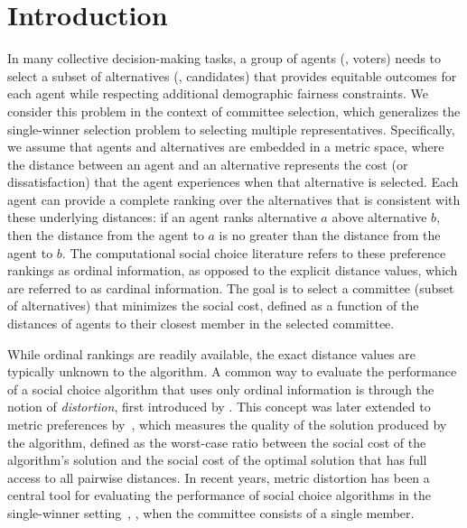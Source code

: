 \documentclass{article}
\begin{document}
\section{Introduction}

In many collective decision-making tasks, a group of agents (\eg, voters) needs to select a subset of alternatives (\eg, candidates) that provides equitable outcomes for each agent while respecting additional demographic fairness constraints.
We consider this problem in the context of committee selection, which generalizes the single-winner selection problem to selecting multiple representatives.
Specifically, we assume that agents and alternatives are embedded in a metric space, where the distance between an agent and an alternative represents the cost (or dissatisfaction) that the agent experiences when that alternative is selected. 
Each agent can provide a complete ranking over the alternatives that is consistent with these underlying distances: if an agent ranks alternative $a$ above alternative $b$, then the distance from the agent to $a$ is no greater than the distance from the agent to $b$. 
The computational social choice literature refers to these preference rankings as ordinal information, as opposed to the explicit distance values, which are referred to as cardinal information. 
The goal is to select a committee (subset of alternatives) that minimizes the social cost, defined as a function of the distances of agents to their closest member in the selected committee. 

While ordinal rankings are readily available, the exact distance values are typically unknown to the algorithm.
A common way to evaluate the performance of a social choice algorithm that uses only ordinal information is through the notion of \emph{distortion}, first introduced by \citet{procaccia2006distortion}.
This concept was later extended to metric preferences by~\cite{anshelevich2018approximating}, which measures the quality of the solution produced by the algorithm, defined as the worst-case ratio between the social cost of the algorithm's solution and the social cost of the optimal solution that has full access to all pairwise distances.
In recent years, metric distortion has been a central tool for evaluating the performance of social choice algorithms in the single-winner setting~\cite{anshelevich2018approximating, munagala2019improved, gkatzelis2020resolving, kizilkaya2022plurality, kizilkaya2023generalized, 
charikar2022metric, fain2019random,
charikar2024breaking}, \ie, when the committee consists of a single member.
\end{document}
